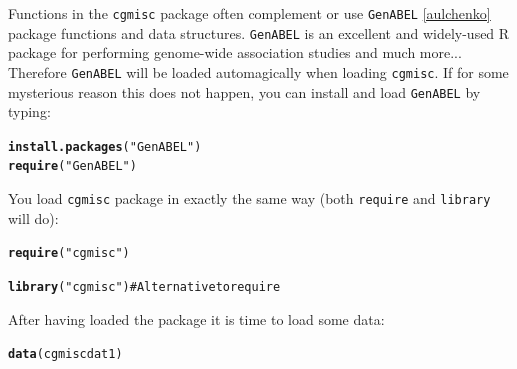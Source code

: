 \documentclass{article}\usepackage{graphicx, color}
\makeatletter
\newcommand{\hlfunctioncall}[1]{\textcolor[rgb]{0.501960784313725,0,0.329411764705882}{\textbf{#1}}}%
\newcommand{\hlstring}[1]{\textcolor[rgb]{0.6,0.6,1}{#1}}%
\newenvironment{kframe}{%
 \def\at@end@of@kframe{}%
 \ifinner\ifhmode%
  \def\at@end@of@kframe{\end{minipage}}%
  \begin{minipage}{\columnwidth}%
 \fi\fi%
 \def\FrameCommand##1{\hskip\@totalleftmargin \hskip-\fboxsep
 \colorbox{shadecolor}{##1}\hskip-\fboxsep
     \hskip-\linewidth \hskip-\@totalleftmargin \hskip\columnwidth}%
 \MakeFramed {\advance\hsize-\width
   \@totalleftmargin\z@ \linewidth\hsize
   \@setminipage}}%
 {\par\unskip\endMakeFramed%
 \at@end@of@kframe}
\newenvironment{knitrout}{}{} %
\makeatother
\begin{document}
\noindent Functions in the {\tt cgmisc} package often complement or use {\tt GenABEL} \ref{aulchenko} package functions and data structures. {\tt GenABEL} is an excellent and widely-used R package for performing genome-wide association studies and much more... Therefore {\tt GenABEL} will be loaded automagically when loading {\tt cgmisc}. If for some mysterious reason this does not happen, you can install and load {\tt GenABEL} by typing:
\begin{knitrout}
\color{fgcolor}\begin{kframe}
\begin{alltt}
\hlfunctioncall{install.packages}(\hlstring{"GenABEL"})
\hlfunctioncall{require}(\hlstring{"GenABEL"})
\end{alltt}
\end{kframe}
\end{knitrout}

\begin{knitrout}
\color{fgcolor}\begin{kframe}


{\ttfamily\noindent\itshape\color{messagecolor}{\#\# Loading required package: GenABEL}}

{\ttfamily\noindent\itshape\color{messagecolor}{\#\# Loading required package: MASS}}

{\ttfamily\noindent\itshape\color{messagecolor}{\#\# GenABEL v. 1.7-4 (February 22, 2013) loaded}}\end{kframe}
\end{knitrout}

\noindent You load {\tt cgmisc} package in exactly the same way (both {\tt require} and {\tt library} will do):
\begin{knitrout}
\color{fgcolor}\begin{kframe}
\begin{alltt}
\hlfunctioncall{require}(\hlstring{"cgmisc"})
\end{alltt}


{\ttfamily\noindent\itshape\color{messagecolor}{\#\# Loading required package: cgmisc}}\begin{alltt}
\hlfunctioncall{library}(\hlstring{"cgmisc"})  # Alternative to require
\end{alltt}
\end{kframe}
\end{knitrout}

\noindent After having loaded the package it is time to load some data:
\begin{knitrout}
\color{fgcolor}\begin{kframe}
\begin{alltt}
\hlfunctioncall{data}(cgmiscdat1)
\end{alltt}
\end{kframe}
\end{knitrout}
\end{document}
